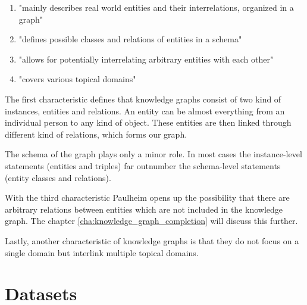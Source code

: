 \begin{enumerate}
\item "mainly describes real world entities and their interrelations, organized in a graph"
\item "defines possible classes and relations of entities
in a schema"
\item "allows for potentially interrelating arbitrary entities with each other"
\item "covers various topical domains"
\end{enumerate}

The first characteristic defines that knowledge graphs consist of two kind of instances, entities and relations. An entity can be almost everything from an individual person to any kind of object. These entities are then linked through different kind of relations, which forms our graph. 

The schema of the graph plays only a minor role. In most cases the instance-level statements (entities and triples) far outnumber the schema-level statements (entity classes and relations). 

With the third characteristic Paulheim opens up the possibility that there are arbitrary relations between entities which are not included in the knowledge graph. The chapter \ref{cha:knowledge_graph_completion} will discuss this further. 

Lastly, another characteristic of knowledge graphs is that they do not focus on a single domain but interlink multiple topical domains. 

\section{Datasets}
\label{cha:datasets}
